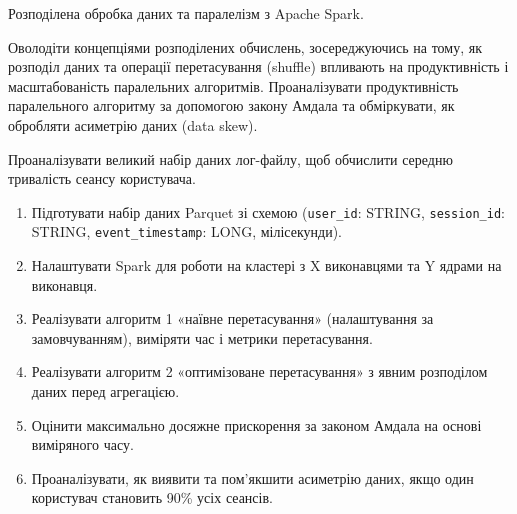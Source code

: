 


 Розподілена обробка даних та паралелізм з Apache Spark.

 Оволодіти концепціями розподілених обчислень, зосереджуючись на тому, як розподіл даних та операції перетасування (shuffle) впливають на продуктивність і масштабованість паралельних алгоритмів. Проаналізувати продуктивність паралельного алгоритму за допомогою закону Амдала та обміркувати, як обробляти асиметрію даних (data skew).

 Проаналізувати великий набір даних лог-файлу, щоб обчислити середню тривалість сеансу користувача.

\begin{enumerate}
  \item Підготувати набір даних Parquet зі схемою (\texttt{user\_id}: STRING, \texttt{session\_id}: STRING, \texttt{event\_timestamp}: LONG, мілісекунди).
  \item Налаштувати Spark для роботи на кластері з X виконавцями та Y ядрами на виконавця.
  \item Реалізувати алгоритм 1 «наївне перетасування» (налаштування за замовчуванням), виміряти час і метрики перетасування.
  \item Реалізувати алгоритм 2 «оптимізоване перетасування» з явним розподілом даних перед агрегацією.
  \item Оцінити максимально досяжне прискорення за законом Амдала на основі виміряного часу.
  \item Проаналізувати, як виявити та пом'якшити асиметрію даних, якщо один користувач становить 90\% усіх сеансів.
\end{enumerate}

